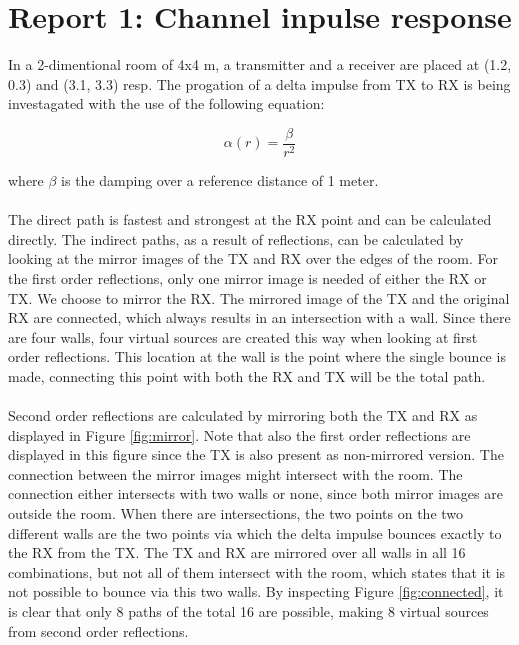 \documentclass[final]{scrreprt} %
\begin{document}
\section{Report 1: Channel inpulse response}
In a 2-dimentional room of 4x4 m, a transmitter and a receiver are placed at (1.2, 0.3) and (3.1, 3.3) resp.
The progation of a delta impulse from TX to RX is being investagated with the use of the following equation:

\begin{equation}
	\alpha (r) = \frac{\beta}{r^2}
\label{eq:damping}
\end{equation}

where $\beta$ is the damping over a reference distance of 1 meter.
\\ \\
The direct path is fastest and strongest at the RX point and can be calculated directly.
The indirect paths, as a result of reflections, can be calculated by looking at the mirror images of the TX and RX over the edges of the room.
For the first order reflections, only one mirror image is needed of either the RX or TX.
We choose to mirror the RX.
The mirrored image of the TX and the original RX are connected, which always results in an intersection with a wall.
Since there are four walls, four virtual sources are created this way when looking at first order reflections.
This location at the wall is the point where the single bounce is made, connecting this point with both the RX and TX will be the total path.
\\ \\
Second order reflections are calculated by mirroring both the TX and RX as displayed in Figure \ref{fig:mirror}.
Note that also the first order reflections are displayed in this figure since the TX is also present as non-mirrored version.
The connection between the mirror images might intersect with the room.
The connection either intersects with two walls or none, since both mirror images are outside the room.
When there are intersections, the two points on the two different walls are the two points via which the delta impulse bounces exactly to the RX from the TX.
The TX and RX are mirrored over all walls in all 16 combinations, but not all of them intersect with the room, which states that it is not possible to bounce via this two walls.
By inspecting Figure \ref{fig:connected}, it is clear that only 8 paths of the total 16 are possible, making 8 virtual sources from second order reflections.
\\ \\
\end{document}

